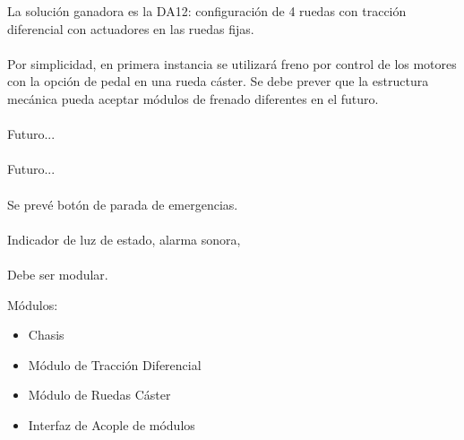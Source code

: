 La solución ganadora es la DA12: configuración de 4 ruedas con tracción diferencial con actuadores en las ruedas fijas.

\paragraph{}
Por simplicidad, en primera instancia se utilizará freno por control de los motores con la opción de pedal en una rueda cáster. Se debe prever que la estructura mecánica pueda aceptar módulos de frenado diferentes en el futuro.


\paragraph{} 

\paragraph{} Futuro...

\paragraph{} Futuro...

\paragraph{} 

\paragraph{} Se prevé botón de parada de emergencias.

\paragraph{} Indicador de luz de estado, alarma sonora, 

\paragraph{} Debe ser modular.

Módulos:
\begin{itemize}
	\item Chasis
	\item Módulo de Tracción Diferencial
	\item Módulo de Ruedas Cáster
	\item Interfaz de Acople de módulos
\end{itemize}


